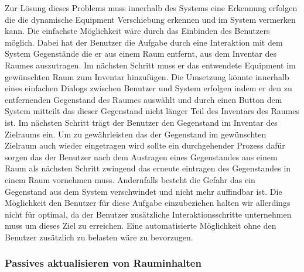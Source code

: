 Zur Lösung dieses Problems muss innerhalb des Systems eine Erkennung erfolgen
die die dynamische Equipment Verschiebung erkennen und im System vermerken
kann. Die einfachste Möglichkeit wäre durch das Einbinden des Benutzers
möglich. Dabei hat der Benutzer die Aufgabe durch eine Interaktion mit dem
System Gegenstände die er aus einem Raum entfernt, aus dem Inventar des Raumes
auszutragen. Im nächsten Schritt muss er das entwendete Equipment im
gewünschten Raum zum Inventar hinzufügen. Die Umsetzung könnte innerhalb eines
einfachen Dialogs zwischen Benutzer und System erfolgen indem er den zu
entfernenden Gegenstand des Raumes auswählt und durch \zB einen Button dem
System mitteilt das dieser Gegenstand nicht länger Teil des Inventars des
Raumes ist. Im nächsten Schritt trägt der Benutzer den Gegenstand im Inventar
des Zielraums ein.
Um zu gewährleisten das der Gegenstand im gewünschten Zielraum auch wieder
eingetragen wird sollte ein durchgehender Prozess dafür sorgen das der Benutzer
nach dem Austragen eines Gegenstandes aus einem Raum als nächsten Schritt
zwingend das erneute eintragen des Gegenstandes in einem Raum vornehmen muss.
Andernfalls besteht die Gefahr das ein Gegenstand aus dem System verschwindet
und nicht mehr auffindbar ist.
Die Möglichkeit den Benutzer für diese Aufgabe einzubeziehen halten wir
allerdings nicht für optimal, da der Benutzer zusätzliche Interaktionsschritte
unternehmen muss um dieses Ziel zu erreichen. Eine automatisierte Möglichkeit
ohne den Benutzer zusätzlich zu belasten wäre zu bevorzugen.

\subsubsection{Passives aktualisieren von Rauminhalten}
\label{sec:Passives_aktualisieren_von_Rauminhalten}

